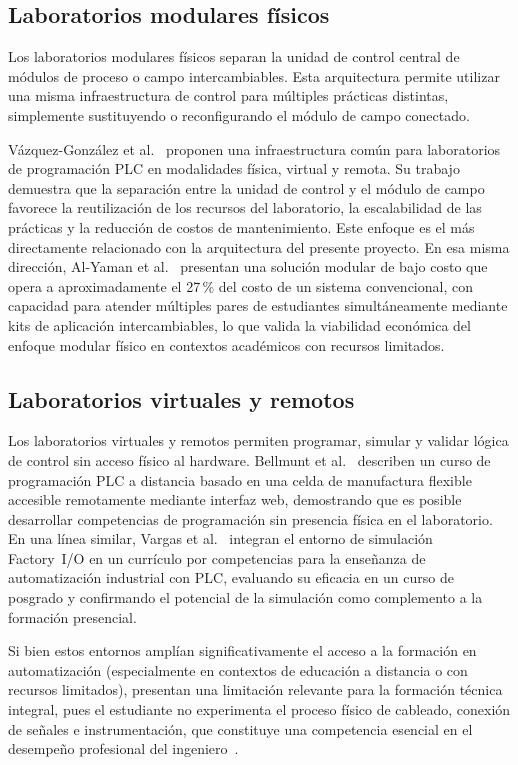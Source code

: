 \documentclass[12pt,a4paper,oneside]{report}
\begin{document}
\subsection{Laboratorios modulares físicos}

Los laboratorios modulares físicos separan la unidad de control central de módulos de proceso o campo intercambiables. Esta arquitectura permite utilizar una misma infraestructura de control para múltiples prácticas distintas, simplemente sustituyendo o reconfigurando el módulo de campo conectado.

Vázquez-González et al.~\cite{ref4} proponen una infraestructura común para laboratorios de programación PLC en modalidades física, virtual y remota. Su trabajo demuestra que la separación entre la unidad de control y el módulo de campo favorece la reutilización de los recursos del laboratorio, la escalabilidad de las prácticas y la reducción de costos de mantenimiento. Este enfoque es el más directamente relacionado con la arquitectura del presente proyecto. En esa misma dirección, Al-Yaman et al.~\cite{ref10} presentan una solución modular de bajo costo que opera a aproximadamente el 27\,\% del costo de un sistema convencional, con capacidad para atender múltiples pares de estudiantes simultáneamente mediante kits de aplicación intercambiables, lo que valida la viabilidad económica del enfoque modular físico en contextos académicos con recursos limitados.

\subsection{Laboratorios virtuales y remotos}

Los laboratorios virtuales y remotos permiten programar, simular y validar lógica de control sin acceso físico al hardware. Bellmunt et al.~\cite{ref5} describen un curso de programación PLC a distancia basado en una celda de manufactura flexible accesible remotamente mediante interfaz web, demostrando que es posible desarrollar competencias de programación sin presencia física en el laboratorio. En una línea similar, Vargas et al.~\cite{ref11} integran el entorno de simulación Factory~I/O en un currículo por competencias para la enseñanza de automatización industrial con PLC, evaluando su eficacia en un curso de posgrado y confirmando el potencial de la simulación como complemento a la formación presencial.

Si bien estos entornos amplían significativamente el acceso a la formación en automatización (especialmente en contextos de educación a distancia o con recursos limitados), presentan una limitación relevante para la formación técnica integral, pues el estudiante no experimenta el proceso físico de cableado, conexión de señales e instrumentación, que constituye una competencia esencial en el desempeño profesional del ingeniero~\cite{ref4,ref5,ref11}.
\end{document}
